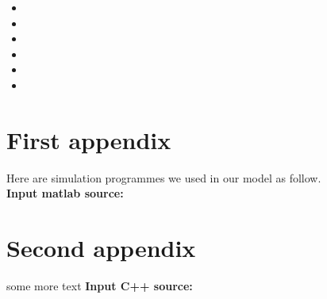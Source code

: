 \documentclass{mcmthesis}
\begin{document}
\begin{itemize}
\item 
\item 
\item 
\item 
 \item 
\item 
\end{itemize}












\begin{appendices}

\section{First appendix}

\lipsum[13]

Here are simulation programmes we used in our model as follow.\\

\textbf{\textcolor[rgb]{0.98,0.00,0.00}{Input matlab source:}}
% 

\section{Second appendix}

some more text \textcolor[rgb]{0.98,0.00,0.00}{\textbf{Input C++ source:}}
% 

\end{appendices}
\end{document}

